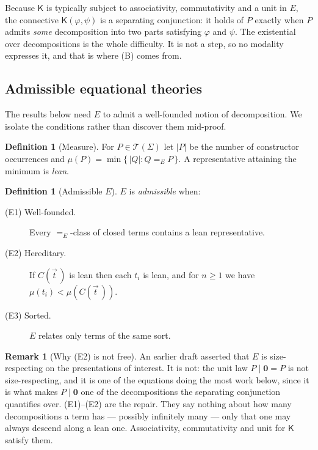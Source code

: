 \documentclass[11pt]{article}
\theoremstyle{plain}
\theoremstyle{definition}
\newtheorem{definition}[theorem]{Definition}
\newtheorem{remark}[theorem]{Remark}
\newcommand{\Kc}{\mathsf{K}}
\newcommand{\Terms}{\mathcal{T}}
\begin{document}
Because $\Kc$ is typically subject to associativity, commutativity and a unit in $E$, the connective
$\Kc(\varphi,\psi)$ is a separating conjunction: it holds of $P$ exactly when $P$ admits \emph{some}
decomposition into two parts satisfying $\varphi$ and $\psi$. The existential over decompositions is the
whole difficulty. It is not a step, so no modality expresses it, and that is where (B) comes from.

\subsection{Admissible equational theories}

The results below need $E$ to admit a well-founded notion of decomposition. We isolate the conditions
rather than discover them mid-proof.

\begin{definition}[Measure]
For $P \in \Terms(\Sigma)$ let $|P|$ be the number of constructor occurrences and
$\mu(P) = \min\{\,|Q| : Q =_E P\,\}$. A representative attaining the minimum is \emph{lean}.
\end{definition}

\begin{definition}[Admissible $E$]
\label{def:adm}
$E$ is \emph{admissible} when:
\begin{description}
\item[(E1) Well-founded.] Every $=_E$-class of closed terms contains a lean representative.
\item[(E2) Hereditary.] If $C(\vec t\,)$ is lean then each $t_i$ is lean, and for $n \ge 1$ we have
$\mu(t_i) < \mu(C(\vec t\,))$.
\item[(E3) Sorted.] $E$ relates only terms of the same sort.
\end{description}
\end{definition}

\begin{remark}[Why (E2) is not free]
\label{rem:unit}
An earlier draft asserted that $E$ is size-respecting on the presentations of interest. It is not: the
unit law $P \mid \mathbf{0} = P$ is not size-respecting, and it is one of the equations doing the most
work below, since it is what makes $P \mid \mathbf{0}$ one of the decompositions the separating
conjunction quantifies over. (E1)--(E2) are the repair. They say nothing about how many decompositions
a term has --- possibly infinitely many --- only that one may always descend along a lean one.
Associativity, commutativity and unit for $\Kc$ satisfy them.
\end{remark}
\end{document}
